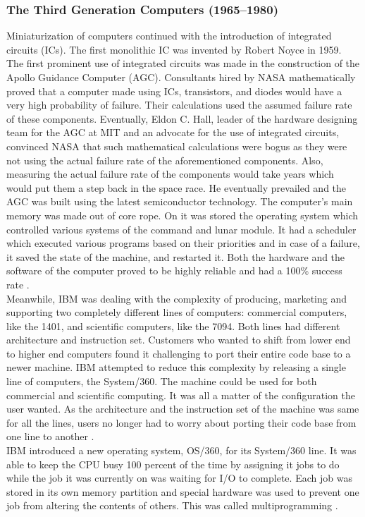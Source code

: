 \subsubsection{The Third Generation Computers (1965--1980)}
Miniaturization of computers continued with the introduction of integrated circuits (ICs). The first monolithic IC was invented by Robert Noyce in 1959. The first prominent use of integrated circuits was made in the construction of the Apollo Guidance Computer (AGC). Consultants hired by NASA mathematically proved that a computer made using ICs, transistors, and diodes would have a very high probability of failure. Their calculations used the assumed failure rate of these components. Eventually, Eldon C. Hall, leader of the hardware designing team for the AGC at MIT and an advocate for the use of integrated circuits, convinced NASA that such mathematical calculations were bogus as they were not using the actual failure rate of the aforementioned components. Also, measuring the actual failure rate of the components would take years which would put them a step back in the space race. He eventually prevailed and the AGC was built using the latest semiconductor technology. The computer's main memory was made out of core rope. On it was stored the operating system which controlled various systems of the command and lunar module. It had a scheduler which executed various programs based on their priorities and in case of a failure, it saved the state of the machine, and restarted it. Both the hardware and the software of the computer proved to be highly reliable and had a 100\% success rate \cite{hall1996journey}.\\
Meanwhile, IBM was dealing with the complexity of producing, marketing and supporting two completely different lines of computers: commercial computers, like the 1401, and scientific computers, like the 7094. Both lines had different architecture and instruction set. Customers who wanted to shift from lower end to higher end computers found it challenging to port their entire code base to a newer machine. IBM attempted to reduce this complexity by releasing a single line of computers, the System/360. The machine could be used for both commercial and scientific computing. It was all a matter of the configuration the user wanted. As the architecture and the instruction set of the machine was same for all the lines, users no longer had to worry about porting their code base from one line to another \citep{tannenbaum2003operating}.\\
IBM introduced a new operating system, OS/360, for its System/360 line. It was able to keep the CPU busy 100 percent of the time by assigning it jobs to do while the job it was currently on was waiting for I/O to complete. Each job was stored in its own memory partition and special hardware was used to prevent one job from altering the contents of others. This was called multiprogramming \cite{tannenbaum2003operating}.\\
